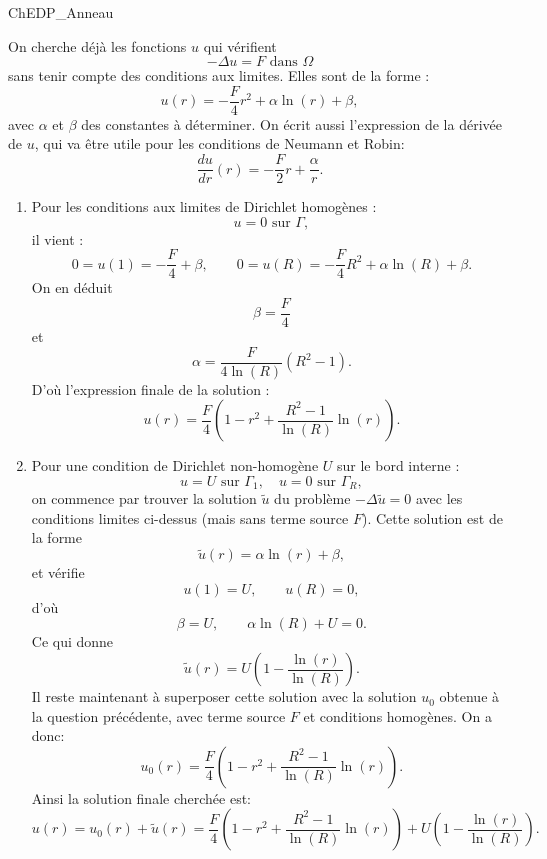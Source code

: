 \begin{corrige}{ChEDP_Anneau}

On cherche déjà les fonctions $u$ qui vérifient 
\[
- \Delta u = F \mbox{ dans } \Omega
\]
sans tenir compte des conditions aux limites.
Elles sont de la forme :
\[
u(r) = -\frac{F}{4} r^2 + \alpha \ln (r) + \beta,
\]
avec $\alpha$ et $\beta$ des constantes à déterminer.
On écrit aussi l'expression de la dérivée de $u$, qui va être utile pour les conditions de Neumann et Robin:
\[
\frac{du}{dr}(r) = -\frac{F}{2} r + \frac{\alpha}{r}.
\]

\begin{enumerate}

\item Pour les conditions aux limites de Dirichlet homogènes :
\[
u = 0 \mbox{ sur } \Gamma,
\]
il vient :
\[
0 = u(1) = -\frac{F}{4} + \beta, \qquad
0 = u(R) = -\frac{F}{4} R^2 + \alpha \ln(R) + \beta.
\]
On en déduit
\[
\beta = \frac{F}{4}
\]
et 
\[
\alpha = \frac{F}{4\ln(R)} ( R^2 - 1 ).
\]
D'où l'expression finale de la solution :
\[
u(r) = \frac{F}{4} \left (
1 - r^2 + \frac{R^2-1}{\ln(R)} \ln(r)
\right ).
\]

\item Pour une condition de Dirichlet non-homogène $U$ sur le bord interne :
\[
u = U \mbox{ sur } \Gamma_1,
\quad u = 0 \mbox{ sur } \Gamma_R,
\]
on commence par trouver la solution $\tilde u$ du problème $-\Delta \tilde u = 0$ avec les conditions limites ci-dessus (mais sans terme source $F$). Cette solution est de la forme 
\[
\tilde u(r) = \alpha \ln(r) + \beta,
\]
et vérifie
\[
u(1) = U, \qquad u(R) = 0,
\]
d'où
\[
\beta = U, \qquad \alpha \ln(R) + U = 0.
\]
Ce qui donne 
\[
\tilde u(r) = U \left ( 1 - \frac{\ln(r)}{\ln(R)} \right ).
\]
Il reste maintenant à superposer cette solution avec la solution $u_0$ obtenue à la question précédente, avec terme source $F$ et conditions homogènes. On a donc:
\[
u_0(r) = \frac{F}{4} \left (
1 - r^2 + \frac{R^2-1}{\ln(R)} \ln(r)
\right ).
\]
Ainsi la solution finale cherchée est:
\[
u(r) = u_0(r) + \tilde u (r) =
\frac{F}{4} \left (
1 - r^2 + \frac{R^2-1}{\ln(R)} \ln(r)
\right ) + U \left ( 1 - \frac{\ln(r)}{\ln(R)} \right ).
\]


\end{enumerate}
\end{corrige}
